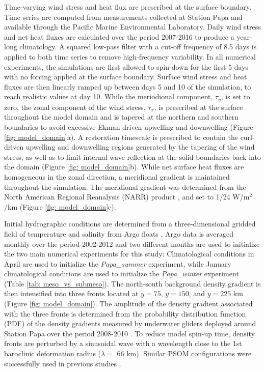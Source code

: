 \documentclass[draft,linenumbers]{agujournal2018}
\begin{document}
Time-varying wind stress and heat flux are prescribed at the surface boundary. Time series are computed from measurements collected at Station Papa and available through the Pacific Marine Environmental Laboratory. Daily wind stress and net heat fluxes are calculated over the period 2007-2016 to produce a year-long climatology. A squared low-pass filter with a cut-off frequency of 8.5 days is applied to both time series to remove high-frequency variability. In all numerical experiments, the simulations are first allowed to spin-down for the first 5 days with no forcing applied at the surface boundary. Surface wind stress and heat fluxes are then linearly ramped up between days 5 and 10 of the simulation, to reach realistic values at day 10. %
While the meriodional component, $\tau_y$, is set to zero, the zonal component of the wind stress, $\tau_x$, is prescribed at the surface throughout the model domain and is tapered at the northern and southern boundaries to avoid excessive Ekman-driven upwelling and downwelling %
(Figure \ref{fig: model_domain}a). A restoration timescale is prescribed to contain the curl-driven upwelling and downwelling regions generated by the tapering of the wind stress, as well as to limit internal wave reflection at the solid boundaries back into the domain (Figure \ref{fig: model_domain}b). While net surface heat fluxes are homogeneous in the zonal direction, a meridional gradient is maintained throughout the simulation. The meridional gradient was determined from the North American Regional Reanalysis (NARR) product \citep{Mesinger_2006}, and set to 1/24 W/m$^2$/km (Figure \ref{fig: model_domain}c).

Initial hydrographic conditions are determined from a three-dimensional gridded field of temperature and salinity from Argo floats \citep{Gaillard_2009,Gaillard_2016}. Argo data is averaged monthly over the period 2002-2012 and two different months are used to initialize the two main numerical experiments for this study: Climatological conditions in April are used to initialize the \textit{Papa\_summer} experiment, while January climatological conditions are used to initialize the \textit{Papa\_winter} experiment (Table \ref{tab: meso_vs_submeso}). The north-south background density gradient is then intensified into three fronts located at $y = 75$, $y = 150$, and $y = 225$ km (Figure \ref{fig: model_domain}). The amplitude of the density gradient associated with the three fronts is determined from the probability distribution function (PDF) of the density gradients measured by underwater gliders deployed around Station Papa over the period 2008-2010 \citep{Pelland_2016}. To reduce model spin-up time, density fronts are perturbed by a sinusoidal wave with a wavelength close to the 1st baroclinic deformation radius ($\lambda = $ 66 km). Similar PSOM configurations were successfully used in previous studies \citep{Mahadevan_2012,Omand_2015}.
\end{document}
